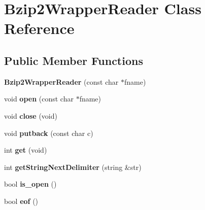 \hypertarget{classBzip2WrapperReader}{\section{Bzip2\-Wrapper\-Reader Class Reference}
\label{classBzip2WrapperReader}
}
\subsection*{Public Member Functions}
\begin{DoxyCompactItemize}
\item 
\hypertarget{classBzip2WrapperReader_a0bdecdcaf30b1006577f42a6629001de}{{\bfseries Bzip2\-Wrapper\-Reader} (const char $\ast$fname)}\label{classBzip2WrapperReader_a0bdecdcaf30b1006577f42a6629001de}

\item 
\hypertarget{classBzip2WrapperReader_a0bb25d5df7cfab7cd54cc8ff066d2dab}{void {\bfseries open} (const char $\ast$fname)}\label{classBzip2WrapperReader_a0bb25d5df7cfab7cd54cc8ff066d2dab}

\item 
\hypertarget{classBzip2WrapperReader_a96ec3efe62161cbaf41ef94a65941a88}{void {\bfseries close} (void)}\label{classBzip2WrapperReader_a96ec3efe62161cbaf41ef94a65941a88}

\item 
\hypertarget{classBzip2WrapperReader_ae6b3ae0c158fb6a24f81827ab8a6ea45}{void {\bfseries putback} (const char c)}\label{classBzip2WrapperReader_ae6b3ae0c158fb6a24f81827ab8a6ea45}

\item 
\hypertarget{classBzip2WrapperReader_a803c207673c905c48c9ea50c247a8915}{int {\bfseries get} (void)}\label{classBzip2WrapperReader_a803c207673c905c48c9ea50c247a8915}

\item 
\hypertarget{classBzip2WrapperReader_a85373852e962cb57de8822df196a40f5}{int {\bfseries get\-String\-Next\-Delimiter} (string \&str)}\label{classBzip2WrapperReader_a85373852e962cb57de8822df196a40f5}

\item 
\hypertarget{classBzip2WrapperReader_a4ee225926da5806e21e7cc75e0b5c408}{bool {\bfseries is\-\_\-open} ()}\label{classBzip2WrapperReader_a4ee225926da5806e21e7cc75e0b5c408}

\item 
\hypertarget{classBzip2WrapperReader_a45dc600e271ef2a51f00450db13582db}{bool {\bfseries eof} ()}\label{classBzip2WrapperReader_a45dc600e271ef2a51f00450db13582db}


\end{DoxyCompactItemize}
